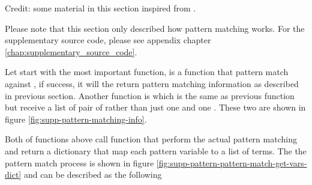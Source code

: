 \documentclass[master.tex]{subfiles}
\begin{document}
Credit: some material in this section inspired from \cite{Bundy:1985:CMM:3720}.

Please note that this section only described how pattern matching works. For the
supplementary source code, please see appendix chapter
\ref{chap:supplementary_source_code}.

Let start with the most important function,  is a function
that pattern match  against , if success, it will
the return pattern matching information as described in previous section.
Another function is  which is the same as
previous function but receive a list of pair of  rather
than just one  and one . These two are shown in
figure \ref{fig:supp-pattern-matching-info}.

Both of functions above call function  that
perform the actual pattern matching and return a dictionary that map each
pattern variable to a list of terms. The the pattern match process is shown in
figure \ref{fig:supp-pattern-pattern-match-get-vars-dict} and can be
described as the following

\newpage
\end{document}
